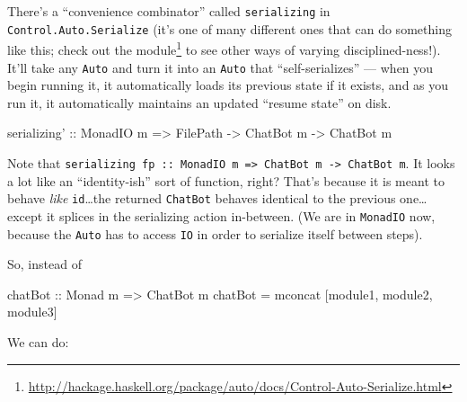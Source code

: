 \documentclass[]{article}
\newenvironment{Shaded}{}{}
\newcommand{\DataTypeTok}[1]{\textcolor[rgb]{0.56,0.13,0.00}{{#1}}}
\newcommand{\StringTok}[1]{\textcolor[rgb]{0.25,0.44,0.63}{{#1}}}
\newcommand{\OtherTok}[1]{\textcolor[rgb]{0.00,0.44,0.13}{{#1}}}
\newcommand{\FunctionTok}[1]{\textcolor[rgb]{0.02,0.16,0.49}{{#1}}}
\newcommand{\NormalTok}[1]{{#1}}
\renewcommand{\href}[2]{#2\footnote{\url{#1}}}
\begin{document}
There's a ``convenience combinator'' called
\texttt{serializing\textquotesingle{}} in
\texttt{Control.Auto.Serialize} (it's one of many different ones that
can do something like this;
\href{http://hackage.haskell.org/package/auto/docs/Control-Auto-Serialize.html}{check
out the module} to see other ways of varying disciplined-ness!). It'll
take any \texttt{Auto} and turn it into an \texttt{Auto} that
``self-serializes'' --- when you begin running it, it automatically
loads its previous state if it exists, and as you run it, it
automatically maintains an updated ``resume state'' on disk.

\begin{Shaded}
\begin{Highlighting}[]
\OtherTok{serializing' ::} \DataTypeTok{MonadIO} \NormalTok{m }\OtherTok{=>} \NormalTok{FilePath }\OtherTok{->} \DataTypeTok{ChatBot} \NormalTok{m }\OtherTok{->} \DataTypeTok{ChatBot} \NormalTok{m}
\end{Highlighting}
\end{Shaded}

Note that
\texttt{serializing\textquotesingle{}\ fp\ ::\ MonadIO\ m\ =\textgreater{}\ ChatBot\ m\ -\textgreater{}\ ChatBot\ m}.
It looks a lot like an ``identity-ish'' sort of function, right? That's
because it is meant to behave \emph{like} \texttt{id}\ldots{}the
returned \texttt{ChatBot} behaves identical to the previous
one\ldots{}except it splices in the serializing action in-between. (We
are in \texttt{MonadIO} now, because the \texttt{Auto} has to access
\texttt{IO} in order to serialize itself between steps).

So, instead of

\begin{Shaded}
\begin{Highlighting}[]
\OtherTok{chatBot ::} \DataTypeTok{Monad} \NormalTok{m }\OtherTok{=>} \DataTypeTok{ChatBot} \NormalTok{m}
\NormalTok{chatBot }\FunctionTok{=} \NormalTok{mconcat [module1, module2, module3]}
\end{Highlighting}
\end{Shaded}

We can do:

\begin{Shaded}
\end{Shaded}
\end{document}
